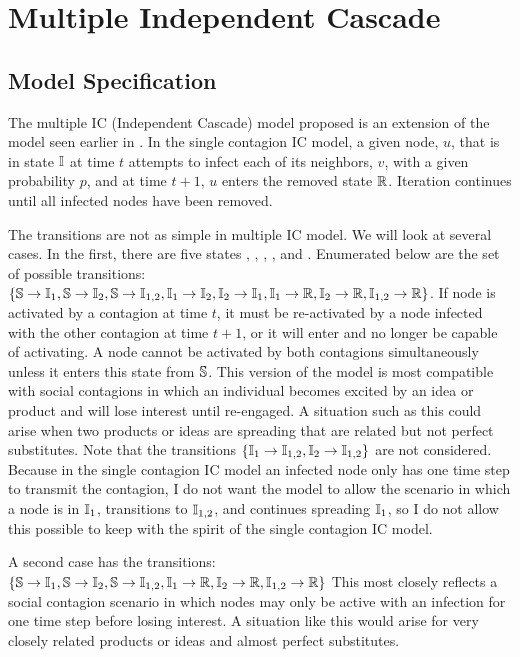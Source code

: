 \documentclass[11pt]{article}
\begin{document}
\section{Multiple Independent Cascade}

\subsection{Model Specification}

The multiple IC (Independent Cascade) model proposed is an extension of the model seen earlier in \cite{KKT_Greedy}. In the single contagion IC model, a given node, $u$, that is in state $\mbox{$\mathbb{I}$}{}$ at time $t$ attempts to infect each of its neighbors, $v$, with a given probability $p$, and at time $t+1$, $u$ enters the removed state $\mbox{$\mathbb{R}$}{}$. Iteration continues until all infected nodes have been removed. 

The transitions are not as simple in multiple IC model. We will look at several cases. In the first, there are five states \sstate{}, \ione{}, \itwo{}, \ionetwo{}, and \rstate{}. Enumerated below are the set of possible transitions:
$    \{\mbox{$\mathbb{S}$} \rightarrow \mbox{$\mathbb{I}_1$}{},
    \mbox{$\mathbb{S}$} \rightarrow \mbox{$\mathbb{I}_2$}{},
    \mbox{$\mathbb{S}$} \rightarrow \mbox{$\mathbb{I}_{1,2}$}{},
    \mbox{$\mathbb{I}_1$} \rightarrow \mbox{$\mathbb{I}_2$}{},
    \mbox{$\mathbb{I}_2$} \rightarrow \mbox{$\mathbb{I}_1$}{},
    \mbox{$\mathbb{I}_1$} \rightarrow \mbox{$\mathbb{R}$}{},
    \mbox{$\mathbb{I}_2$} \rightarrow \mbox{$\mathbb{R}$}{},
    \mbox{$\mathbb{I}_{1,2}$} \rightarrow \mbox{$\mathbb{R}$}
\} $. If node is activated by a contagion at time $t$, it must be re-activated by a node infected with the other contagion at time $t+1$, or it will enter \rstate{} and no longer be capable of activating. A node cannot be activated by both contagions simultaneously unless it enters this state from $\mbox{$\mathbb{S}$}{}$. This version of the model is most compatible with social contagions in which an individual becomes excited by an idea or product and will lose interest until re-engaged. A situation such as this could arise when two products or ideas are spreading that are related but not perfect substitutes. Note that the transitions $\{\mbox{$\mathbb{I}_1$} \rightarrow \mbox{$\mathbb{I}_{1,2}$}{},
    \mbox{$\mathbb{I}_2$} \rightarrow \mbox{$\mathbb{I}_{1,2}$}{}\}$ are not considered. Because in the single contagion IC model an infected node only has one time step to transmit the contagion, I do not want the model to allow the scenario in which a node is in $\mbox{$\mathbb{I}_1$}{}$, transitions to $\mbox{$\mathbb{I}_{1,2}$}{}$, and continues spreading $\mbox{$\mathbb{I}_1$}{}$, so I do not allow this possible to keep with the spirit of the single contagion IC model.
    
A second case has the transitions: $    \{\mbox{$\mathbb{S}$} \rightarrow \mbox{$\mathbb{I}_1$}{},
    \mbox{$\mathbb{S}$} \rightarrow \mbox{$\mathbb{I}_2$}{},
    \mbox{$\mathbb{S}$} \rightarrow \mbox{$\mathbb{I}_{1,2}$}{},
    \mbox{$\mathbb{I}_1$} \rightarrow \mbox{$\mathbb{R}$}{},
    \mbox{$\mathbb{I}_2$} \rightarrow \mbox{$\mathbb{R}$}{},
    \mbox{$\mathbb{I}_{1,2}$} \rightarrow \mbox{$\mathbb{R}$}
\} $ This most closely reflects a social contagion scenario in which nodes may only be active with an infection for one time step before losing interest. A situation like this would arise for very closely related products or ideas and almost perfect substitutes.
\end{document}
